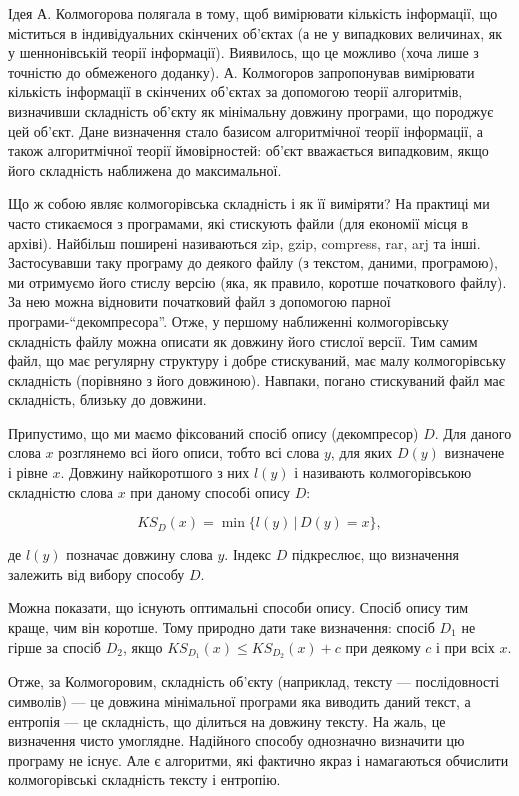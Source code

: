 \documentclass[
  letterpaper,
]{report}
\begin{document}
Ідея А. Колмогорова полягала в тому, щоб вимірювати кількість
інформації, що міститься в індивідуальних скінчених об'єктах (а не у
випадкових величинах, як у шеннонівській теорії інформації). Виявилось,
що це можливо (хоча лише з точністю до обмеженого доданку). А.
Колмогоров запропонував вимірювати кількість інформації в скінчених
об'єктах за допомогою теорії алгоритмів, визначивши складність об'єкту
як мінімальну довжину програми, що породжує цей об'єкт. Дане визначення
стало базисом алгоритмічної теорії інформації, а також алгоритмічної
теорії ймовірностей: об'єкт вважається випадковим, якщо його складність
наближена до максимальної.

Що ж собою являє колмогорівська складність і як її виміряти? На практиці
ми часто стикаємося з програмами, які стискують файли (для економії
місця в архіві). Найбільш поширені називаються zip, gzip, compress, rar,
arj та інші. Застосувавши таку програму до деякого файлу (з текстом,
даними, програмою), ми отримуємо його стислу версію (яка, як правило,
коротше початкового файлу). За нею можна відновити початковий файл з
допомогою парної програми-``декомпресора''. Отже, у першому наближенні
колмогорівську складність файлу можна описати як довжину його стислої
версії. Тим самим файл, що має регулярну структуру і добре стискуваний,
має малу колмогорівську складність (порівняно з його довжиною). Навпаки,
погано стискуваний файл має складність, близьку до довжини.

Припустимо, що ми маємо фіксований спосіб опису (декомпресор) \(D\). Для
даного слова \(x\) розглянемо всі його описи, тобто всі слова \(y\), для
яких \(D(y)\) визначене \(і\) рівне \(x\). Довжину найкоротшого з них
\(l(y)\) і називають колмогорівською складністю слова \(x\) при даному
способі опису \(D\):

\[
KS_{D}(x) = \min\{l(y)\,|\,D(y)=x\},
\]

де \(l(y)\) позначає довжину слова \(y\). Індекс \(D\) підкреслює, що
визначення залежить від вибору способу \(D\).

Можна показати, що існують оптимальні способи опису. Спосіб опису тим
краще, чим він коротше. Тому природно дати таке визначення: спосіб
\(D_1\) не гірше за спосіб \(D_2\), якщо
\(KS_{D_1}(x) \leq KS_{D_2}(x)+c\) при деякому \(c\) і при всіх \(x\).

Отже, за Колмогоровим, складність об'єкту (наприклад, тексту ---
послідовності символів) --- це довжина мінімальної програми яка виводить
даний текст, а ентропія --- це складність, що ділиться на довжину
тексту. На жаль, це визначення чисто умоглядне. Надійного способу
однозначно визначити цю програму не існує. Але є алгоритми, які фактично
якраз і намагаються обчислити колмогорівські складність тексту і
ентропію.
\end{document}
